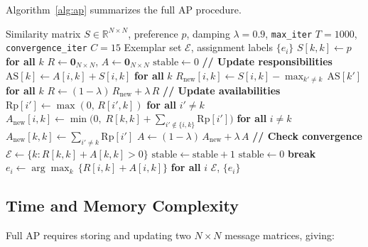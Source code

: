 \documentclass[11pt]{article}
\begin{document}
Algorithm~\ref{alg:ap} summarizes the full AP procedure.

\begin{algorithm}[h]
\caption{Affinity Propagation}
\label{alg:ap}
\begin{algorithmic}[1]
\Require Similarity matrix $S \in \mathbb{R}^{N \times N}$, preference $p$, damping $\lambda = 0.9$, \texttt{max\_iter} $T = 1000$, \texttt{convergence\_iter} $C = 15$
\Ensure Exemplar set $\mathcal{E}$, assignment labels $\{e_i\}$
\State $S[k,k] \leftarrow p$ \textbf{ for all } $k$ 
\State $R \leftarrow \mathbf{0}_{N\times N}$,\; $A \leftarrow \mathbf{0}_{N\times N}$ 
\State $\text{stable} \leftarrow 0$
    \State \textbf{// Update responsibilities}
        \State $\mathrm{AS}[k] \leftarrow A[i,k] + S[i,k]$ \textbf{ for all } $k$
        \State $R_{\mathrm{new}}[i,k] \leftarrow S[i,k] - \max_{k' \neq k}\,\mathrm{AS}[k']$ \textbf{ for all } $k$
    \EndFor
    \State $R \leftarrow (1-\lambda)\,R_{\mathrm{new}} + \lambda\,R$
    \State \textbf{// Update availabilities}
        \State $\mathrm{Rp}[i'] \leftarrow \max(0,\, R[i',k])$ \textbf{ for all } $i' \neq k$
        \State $A_{\mathrm{new}}[i,k] \leftarrow \min\!\bigl(0,\; R[k,k] + \sum_{i' \notin \{i,k\}} \mathrm{Rp}[i']\bigr)$ \textbf{ for all } $i \neq k$
        \State $A_{\mathrm{new}}[k,k] \leftarrow \sum_{i' \neq k} \mathrm{Rp}[i']$
    \EndFor
    \State $A \leftarrow (1-\lambda)\,A_{\mathrm{new}} + \lambda\,A$
    \State \textbf{// Check convergence}
    \State $\mathcal{E} \leftarrow \{k : R[k,k] + A[k,k] > 0\}$
        \State $\text{stable} \leftarrow \text{stable} + 1$
    \Else
        \State $\text{stable} \leftarrow 0$
    \EndIf
     \textbf{break} \EndIf
\EndFor
\State $e_i \leftarrow \arg\max_k\,\{R[i,k] + A[i,k]\}$ \textbf{ for all } $i$ 
\State \Return $\mathcal{E}$, $\{e_i\}$
\end{algorithmic}
\end{algorithm}

\subsection{Time and Memory Complexity}

Full AP requires storing and updating two $N \times N$ message matrices, giving:
\end{document}
